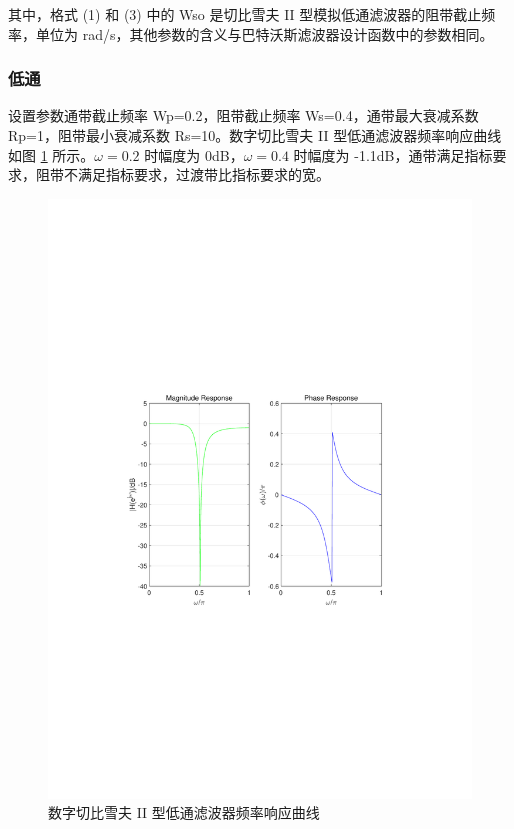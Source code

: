 \documentclass[12pt,AutoFakeBold]{article}
\begin{document}
其中，格式 (1) 和 (3) 中的 Wso 是切比雪夫 II 型模拟低通滤波器的阻带截止频率，单位为 rad/s，其他参数的含义与巴特沃斯滤波器设计函数中的参数相同。

\subsubsection{低通}

设置参数通带截止频率 Wp=0.2，阻带截止频率 Ws=0.4，通带最大衰减系数 Rp=1，阻带最小衰减系数 Rs=10。数字切比雪夫 II 型低通滤波器频率响应曲线如图 \ref{fig:LPC2F} 所示。$\omega=0.2$ 时幅度为 0dB，$\omega=0.4$ 时幅度为 -1.1dB，通带满足指标要求，阻带不满足指标要求，过渡带比指标要求的宽。

\begin{figure}[hbtp]
	\centering
	\includegraphics[width=14cm]{figure/LPC2F.pdf}
	\caption{数字切比雪夫 II 型低通滤波器频率响应曲线} \label{fig:LPC2F}
\end{figure}
\end{document}
